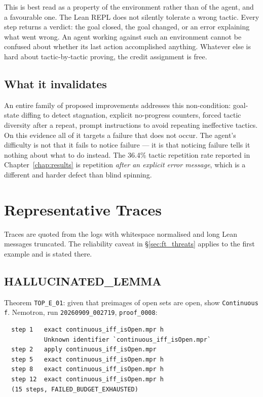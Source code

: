 This is best read as a property of the environment rather than of the agent, and
a favourable one. The Lean REPL does not silently tolerate a wrong tactic. Every
step returns a verdict: the goal closed, the goal changed, or an error
explaining what went wrong. An agent working against such an environment cannot
be confused about whether its last action accomplished anything. Whatever else
is hard about tactic-by-tactic proving, the credit assignment is free.

\subsection{What it invalidates}

An entire family of proposed improvements addresses this non-condition:
goal-state diffing to detect stagnation, explicit no-progress counters, forced
tactic diversity after a repeat, prompt instructions to avoid repeating
ineffective tactics. On this evidence all of it targets a failure that does not
occur. The agent's difficulty is not that it fails to notice failure --- it is
that noticing failure tells it nothing about what to do instead. The 36.4\%
tactic repetition rate reported in Chapter~\ref{chap:results} is repetition
\emph{after an explicit error message}, which is a different and harder defect
than blind spinning.

\section{Representative Traces}
\label{sec:ft_traces}

Traces are quoted from the logs with whitespace normalised and long Lean
messages truncated. The reliability caveat in \S\ref{sec:ft_threats} applies to
the first example and is stated there.

\subsection{HALLUCINATED\_LEMMA}

Theorem \texttt{TOP\_E\_01}: given that preimages of open sets are open, show
\texttt{Continuous f}. Nemotron, run \texttt{20260909\_002719},
\texttt{proof\_0008}:

\begin{verbatim}
  step 1   exact continuous_iff_isOpen.mpr h
           Unknown identifier `continuous_iff_isOpen.mpr`
  step 2   apply continuous_iff_isOpen.mpr
  step 5   exact continuous_iff_isOpen.mpr h
  step 8   exact continuous_iff_isOpen.mpr h
  step 12  exact continuous_iff_isOpen.mpr h
  (15 steps, FAILED_BUDGET_EXHAUSTED)
\end{verbatim}

